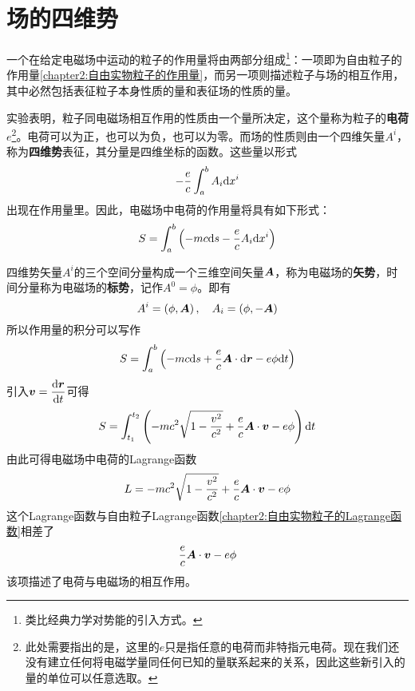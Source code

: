 \section{场的四维势}

一个在给定电磁场中运动的粒子的作用量将由两部分组成\footnote{类比经典力学对势能的引入方式。}：一项即为自由粒子的作用量\eqref{chapter2:自由实物粒子的作用量}，而另一项则描述粒子与场的相互作用，其中必然包括表征粒子本身性质的量和表征场的性质的量。

实验表明，粒子同电磁场相互作用的性质由一个量所决定，这个量称为粒子的{\bf 电荷}$e$\footnote{此处需要指出的是，这里的$e$只是指任意的电荷而非特指元电荷。现在我们还没有建立任何将电磁学量同任何已知的量联系起来的关系，因此这些新引入的量的单位可以任意选取。}。电荷可以为正，也可以为负，也可以为零。而场的性质则由一个四维矢量$A^i$，称为{\bf 四维势}表征，其分量是四维坐标的函数。这些量以形式
\begin{equation*}
	-\frac{e}{c}\int_a^b A_i\mathrm{d} x^i
\end{equation*}
出现在作用量里。因此，电磁场中电荷的作用量将具有如下形式：
\begin{equation}
	S = \int_a^b \left(-mc\mathrm{d} s - \frac{e}{c}A_i\mathrm{d} x^i\right)
	\label{chapter3:电磁场中电荷的作用量1}
\end{equation}

四维势矢量$A^i$的三个空间分量构成一个三维空间矢量$\boldsymbol{A}$，称为电磁场的{\bf 矢势}，时间分量称为电磁场的{\bf 标势}，记作$A^0 = \phi$。即有
\begin{equation}
	A^i = \left(\phi,\boldsymbol{A}\right),\quad A_i = \left(\phi,-\boldsymbol{A}\right)
	\label{chapter3:电磁场的标势和矢势}
\end{equation}
所以作用量的积分可以写作
\begin{equation*}
	S = \int_a^b \left(-mc\mathrm{d} s + \frac{e}{c}\boldsymbol{A}\cdot \mathrm{d} \boldsymbol{r} - e\phi \mathrm{d} t\right)
\end{equation*}
引入$\boldsymbol{v} = \dfrac{\mathrm{d} \boldsymbol{r}}{\mathrm{d} t}$可得
\begin{equation}
	S = \int_{t_1}^{t_2} \left(-mc^2\sqrt{1-\frac{v^2}{c^2}} + \frac{e}{c}\boldsymbol{A}\cdot \boldsymbol{v} - e\phi\right) \mathrm{d} t
	\label{chapter3:电磁场中电荷的作用量2}
\end{equation}
由此可得电磁场中电荷的Lagrange函数
\begin{equation}
	L = -mc^2\sqrt{1-\frac{v^2}{c^2}} + \frac{e}{c}\boldsymbol{A}\cdot \boldsymbol{v} - e\phi
	\label{chapter3:电磁场中电荷的Lagrange函数}
\end{equation}
这个Lagrange函数与自由粒子Lagrange函数\eqref{chapter2:自由实物粒子的Lagrange函数}相差了
\begin{equation*}
	\frac{e}{c}\boldsymbol{A}\cdot \boldsymbol{v} - e\phi
\end{equation*}
该项描述了电荷与电磁场的相互作用。

